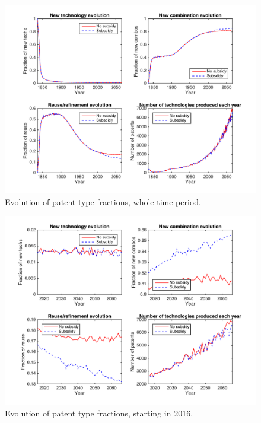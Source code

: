 \documentclass[a4paper,11pt]{article}
\begin{document}
\begin{figure}[h!]
\centering
\includegraphics[scale=.6]{figures/patentsNC}
\caption{Evolution of patent type fractions, whole time period.}
\end{figure}

\begin{figure}[h!]
\centering
\includegraphics[scale=.6]{figures/patents2016NC}
\caption{Evolution of patent type fractions, starting in 2016.}
\end{figure}
\end{document}
